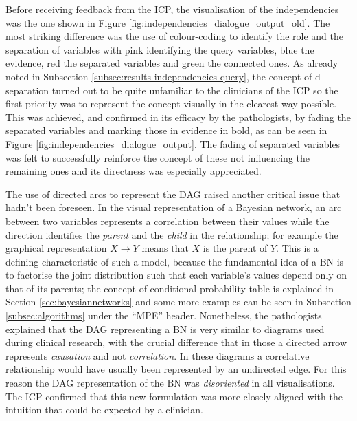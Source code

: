 Before receiving feedback from the ICP, the visualisation of the independencies was the one shown in Figure \ref{fig:independencies_dialogue_output_old}.
The most striking difference was the use of colour-coding to identify the role and the separation of variables with pink identifying the query variables, blue the evidence, red the separated variables and green the connected ones.
As already noted in Subsection \ref{subsec:results-independencies-query}, the concept of d-separation turned out to be quite unfamiliar to the clinicians of the ICP so the first priority was to represent the concept visually in the clearest way possible.
This was achieved, and confirmed in its efficacy by the pathologists, by fading the separated variables and marking those in evidence in bold, as can be seen in Figure \ref{fig:independencies_dialogue_output}.
The fading of separated variables was felt to successfully reinforce the concept of these not influencing the remaining ones and its directness was especially appreciated.

The use of directed arcs to represent the DAG raised another critical issue that hadn't been foreseen.
In the visual representation of a Bayesian network, an arc between two variables represents a correlation between their values while the direction identifies the \textit{parent} and the \textit{child} in the relationship; for example the graphical representation $X \rightarrow Y$ means that $X$ is the parent of $Y$.
This is a defining characteristic of such a model, because the fundamental idea of a BN is to factorise the joint distribution such that each variable's values depend only on that of its parents; the concept of conditional probability table is explained in Section \ref{sec:bayesiannetworks} and some more examples can be seen in Subsection \ref{subsec:algorithms} under the \enquote{MPE} header.
Nonetheless, the pathologists explained that the DAG representing a BN is very similar to diagrams used during clinical research, with the crucial difference that in those a directed arrow represents \textit{causation} and not \textit{correlation}.
In these diagrams a correlative relationship would have usually been represented by an undirected edge.
For this reason the DAG representation of the BN was \textit{disoriented} in all visualisations.
The ICP confirmed that this new formulation was more closely aligned with the intuition that could be expected by a clinician.

